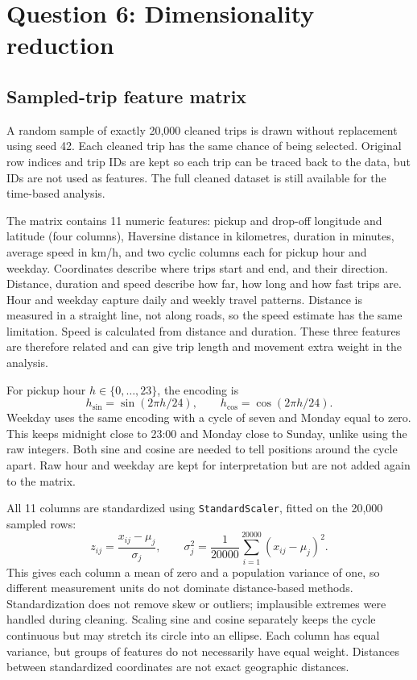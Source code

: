\documentclass{article}
\begin{document}
\section*{Question 6: Dimensionality reduction}

\subsection{Sampled-trip feature matrix}

A random sample of exactly 20,000 cleaned trips is drawn without replacement
using seed 42. Each cleaned trip has the same chance of being selected. Original row indices and trip IDs are kept so each trip can be traced
back to the data, but IDs are not used as features. The full cleaned dataset
is still available for the time-based analysis.

The matrix contains 11 numeric features: pickup and drop-off longitude and
latitude (four columns), Haversine distance in kilometres, duration in minutes,
average speed in km/h, and two cyclic columns each for pickup hour and weekday.
Coordinates describe where trips start and end, and their direction.
Distance, duration and speed describe how far, how long and how fast trips
are. Hour and weekday capture daily and weekly travel patterns. Distance is
measured in a straight line, not along roads, so the speed estimate has the
same limitation. Speed is calculated from distance and duration. These three
features are therefore related and can give trip length and movement extra
weight in the analysis.

For pickup hour $h\in\{0,\ldots,23\}$, the encoding is
\begin{equation}
  h_{\sin}=\sin(2\pi h/24), \qquad h_{\cos}=\cos(2\pi h/24).
\end{equation}
Weekday uses the same encoding with a cycle of seven and Monday equal to zero.
This keeps midnight close to 23:00 and Monday close to Sunday, unlike using
the raw integers. Both sine and cosine are needed to tell positions around
the cycle apart. Raw hour and weekday are kept for interpretation but are
not added again to the matrix.

All 11 columns are standardized using \texttt{StandardScaler}, fitted on the
20,000 sampled rows:
\begin{equation}
  z_{ij}=\frac{x_{ij}-\mu_j}{\sigma_j},
  \qquad
  \sigma_j^2=\frac{1}{20000}\sum_{i=1}^{20000}(x_{ij}-\mu_j)^2.
\end{equation}
This gives each column a mean of zero and a population variance of one,
so different measurement units do not dominate distance-based methods.
Standardization does not remove skew or outliers; implausible extremes were
handled during cleaning. Scaling sine and cosine separately keeps the cycle
continuous but may stretch its circle into an ellipse. Each column has equal
variance, but groups of features do not necessarily have equal weight.
Distances between standardized coordinates are not exact geographic distances.
\end{document}
